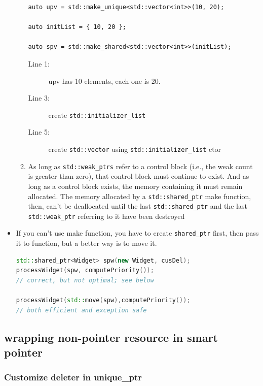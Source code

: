 \documentclass[a4paper,11pt,twoside]{book}
\begin{document}
\begin{itemize}
\begin{enumerate}
\begin{lstlisting}
auto upv = std::make_unique<std::vector<int>>(10, 20);

auto initList = { 10, 20 };

auto spv = std::make_shared<std::vector<int>>(initList);
\end{lstlisting}
\begin{description}
	\item[Line 1:] upv has 10 elements, each one is 20.
	\item[Line 3:] create \texttt{std::initializer\_list}
	\item[Line 5:] create \texttt{std::vector} using \texttt{std::initializer\_list} ctor
\end{description}
		
		\item As long as \texttt{std::weak\_ptrs} refer to a control block (i.e., the weak count is greater than zero), that control block must continue to exist. And as long as a control block exists, the memory containing it must remain allocated. The memory allocated by a \texttt{std::shared\_ptr} make function, then, can't be deallocated until the last \texttt{std::shared\_ptr} and the last \texttt{std::weak\_ptr} referring to it have been destroyed
	\end{enumerate}
	
	\item If you can't use make function, you have to create \texttt{shared\_ptr} first, then pass it to function, but a better way is to move it.
\begin{lstlisting}[frame=single, language=c++]
std::shared_ptr<Widget> spw(new Widget, cusDel);
processWidget(spw, computePriority()); 
// correct, but not optimal; see below

processWidget(std::move(spw),computePriority());  
// both efficient and exception safe
\end{lstlisting}
	
\end{itemize}

\subsection{wrapping non-pointer resource in smart pointer}

\subsubsection{Customize deleter in unique\_ptr}
\end{document}
